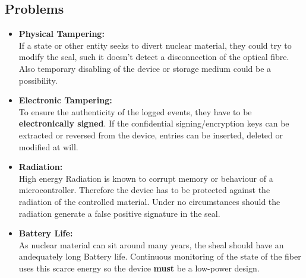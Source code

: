 \documentclass[12pt,twoside,a4paper]{scrartcl}
\begin{document}
      \subsection{Problems}
        \begin{center}
            \begin{itemize}
                \item \textbf{Physical Tampering:} \\
                        If a state or other entity seeks to divert nuclear material, they could try to modify the seal, such it doesn't detect a disconnection of the optical fibre. Also temporary disabling of the device or storage medium could be a possibility.
                
                \item \textbf{Electronic Tampering:} \\
                    To ensure the authenticity of the logged events, they have to be \textbf{electronically signed}. If the confidential signing/encryption keys can be extracted or reversed from the device, entries can be inserted, deleted or modified at will.
                    
                \item \textbf{Radiation:} \\
                        High energy Radiation is known to corrupt memory or behaviour of a microcontroller. Therefore the device has to be protected against the radiation of the controlled material. Under no circumstances
                        should the radiation generate a false positive signature in the seal.
                        
                \item \textbf{Battery Life:} \\
                        As nuclear material can sit around many years, the sheal should have an andequately long Battery life. Continuous monitoring of the state of the fiber uses this scarce energy so the device \textbf{must}
                        be a low-power design.
                        
            \end{itemize}
        \end{center}
        
\end{document}
